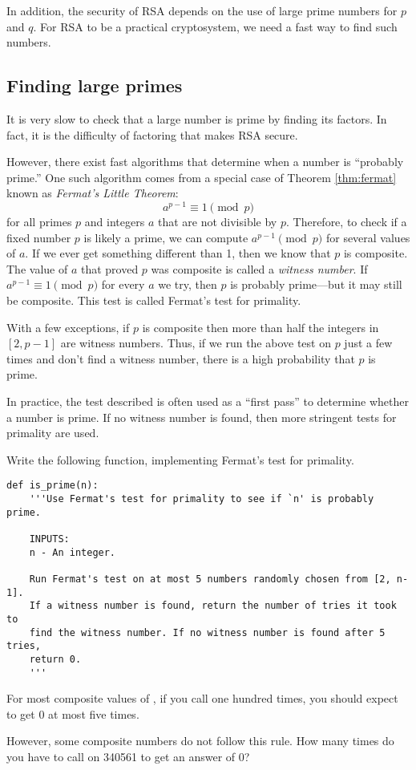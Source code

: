 In addition, the security of RSA depends on the use of large prime numbers for $p$ and $q$.
For RSA to be a practical cryptosystem, we need a fast way to find such numbers.


\subsection*{Finding large primes}
It is very slow to check that a large number is prime by finding its factors.
In fact, it is the difficulty of factoring that makes RSA secure.

However, there exist fast algorithms that determine when a number is ``probably prime.''
One such algorithm comes from a special case of Theorem \ref{thm:fermat} known as \emph{Fermat's Little Theorem}:
\[
a^{p-1} \equiv 1 \pmod{p}
\]
for all primes $p$ and integers $a$ that are not divisible by $p$.
Therefore, to check if a fixed number $p$ is likely a prime, we can compute $a^{p-1} \pmod{p}$ for several values of $a$.
If we ever get something different than 1, then we know that $p$ is composite.
The value of $a$ that proved $p$ was composite is called a \emph{witness number}.
If  $a^{p-1} \equiv 1 \pmod{p}$ for every $a$ we try, then $p$ is probably prime---but it may still be composite.
This test is called Fermat's test for primality.

With a few exceptions, if $p$ is composite then more than half the integers in $[2, p-1]$ are witness numbers.
Thus, if we run the above test on $p$ just a few times and don't find a witness number, there is a high probability that $p$ is prime.

In practice, the test described is often used as a ``first pass'' to determine whether a number is prime. 
If no witness number is found, then more stringent tests for primality are used.


\begin{problem}
Write the following function, implementing Fermat's test for primality.
\begin{lstlisting}
def is_prime(n):
    '''Use Fermat's test for primality to see if `n' is probably prime.
    
    INPUTS:
    n - An integer.
    
    Run Fermat's test on at most 5 numbers randomly chosen from [2, n-1]. 
    If a witness number is found, return the number of tries it took to 
    find the witness number. If no witness number is found after 5 tries, 
    return 0.
    '''
\end{lstlisting}
For most composite values of , if you call  one hundred times, you should expect to get 0 at most five times.

However, some composite numbers do not follow this rule. 
How many times do you have to call  on 340561 to get an answer of 0?
\label{prob:prime_confidence}
\end{problem}






